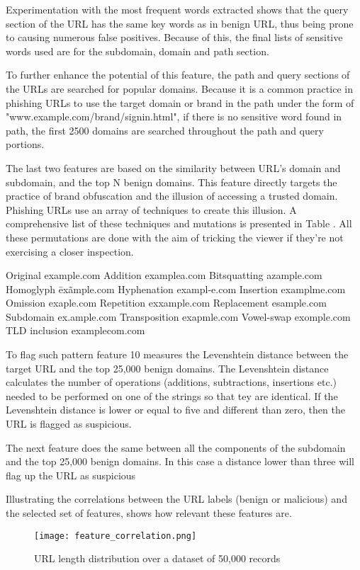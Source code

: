 Experimentation with the most frequent words extracted shows that the query section of the URL has the same key words as in benign URL, thus being prone to causing numerous false positives. Because of this, the final lists of sensitive words used are for the subdomain, domain and path section.

To further enhance the potential of this feature, the path and query sections of the URLs are searched for popular domains. Because it is a common practice in phishing URLs to use the target domain or brand in the path under the form of "www.example.com/brand/signin.html", if there is no sensitive word found in path, the first 2500 domains are searched throughout the path and query portions.

The last two features are based on the similarity between URL's domain and subdomain, and the top N benign domains. This feature directly targets the practice of brand obfuscation and the illusion of accessing a trusted domain.
Phishing URLs use an array of techniques to create this illusion. A comprehensive list of these techniques and mutations is presented in Table . All these permutations are done with the aim of tricking the viewer if they're not exercising a closer inspection.


Original example.com
Addition examplea.com
Bitsquatting azample.com
Homoglyph ēxãmple.com
Hyphenation exampl-e.com
Insertion examplme.com
Omission exaple.com
Repetition exxample.com
Replacement esample.com
Subdomain ex.ample.com
Transposition exapmle.com
Vowel-swap exomple.com
TLD inclusion examplecom.com

To flag such pattern feature 10 measures the Levenshtein distance between the target URL and the top 25,000 benign domains. The Levenshtein distance calculates the number of operations (additions, subtractions, insertions etc.) needed to be performed on one of the strings so that tey are identical. If the Levenshtein distance is lower or equal to five and different than zero, then the URL is flagged as suspicious.

The next feature does the same between all the components of the subdomain and the top 25,000 benign domains. In this case a distance lower than three will flag up the URL as suspicious

Illustrating the correlations between the URL labels (benign or malicious) and the selected set of features, shows how relevant these features are.

\begin{figure}[t]
	\centering
	\texttt{[image: feature\_correlation.png]}
	\caption{URL length distribution over a dataset of 50,000 records}
	\label{fig:FEATURE_CORRELATION}
\end{figure}

